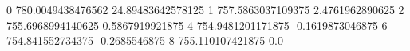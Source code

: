 0 780.0049438476562 24.89483642578125
1 757.5863037109375 2.4761962890625
2 755.6968994140625 0.5867919921875
4 754.9481201171875 -0.1619873046875
6 754.841552734375 -0.2685546875
8 755.110107421875 0.0

